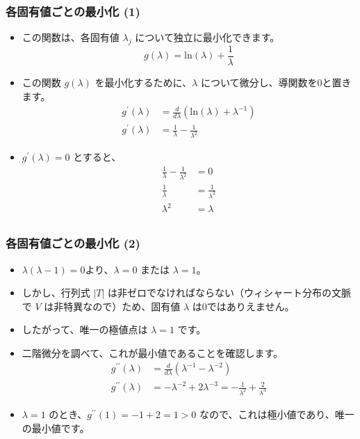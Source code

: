 \documentclass{beamer}
\begin{document}
\begin{frame}
\frametitle{各固有値ごとの最小化 (1)}
\begin{itemize}
    \item この関数は、各固有値 $\lambda_j$ について独立に最小化できます。
    \[ g(\lambda)=\text{ln}(\lambda)+\frac{1}{\lambda} \]
    \item この関数 $g(\lambda)$ を最小化するために、$\lambda$ について微分し、導関数を0と置きます。
    \begin{align*}
        g^{\prime}(\lambda)&=\frac{d}{d\lambda}(\text{ln}(\lambda)+\lambda^{-1}) \\
        g^{\prime}(\lambda)&=\frac{1}{\lambda}-\frac{1}{\lambda^2}
    \end{align*}
    \item $g^{\prime}(\lambda)=0$ とすると、
    \begin{align*}
        \frac{1}{\lambda}-\frac{1}{\lambda^2}&=0 \\
        \frac{1}{\lambda}&=\frac{1}{\lambda^2} \\
        \lambda^2&=\lambda \\
    \end{align*}
\end{itemize}
\end{frame}

\begin{frame}
\frametitle{各固有値ごとの最小化 (2)}
\begin{itemize}
    \item $\lambda(\lambda-1)=0$より、$\lambda=0$ または $\lambda=1$。
        \item しかし、行列式 $|T|$ は非ゼロでなければならない（ウィシャート分布の文脈で $V$ は非特異なので）ため、固有値 $\lambda$ は0ではありえません。
        \item したがって、唯一の極値点は $\lambda=1$ です。
        \item 二階微分を調べて、これが最小値であることを確認します。
        \begin{align*}
            g^{\prime\prime}(\lambda)&=\frac{d}{d\lambda}(\lambda^{-1}-\lambda^{-2}) \\
            g^{\prime\prime}(\lambda)&=-\lambda^{-2}+2\lambda^{-3}=-\frac{1}{\lambda^2}+\frac{2}{\lambda^3}
        \end{align*}
        \item $\lambda=1$ のとき、$g^{\prime\prime}(1)=-1+2=1>0$ なので、これは極小値であり、唯一の最小値です。
\end{itemize}
\end{frame}
\end{document}
